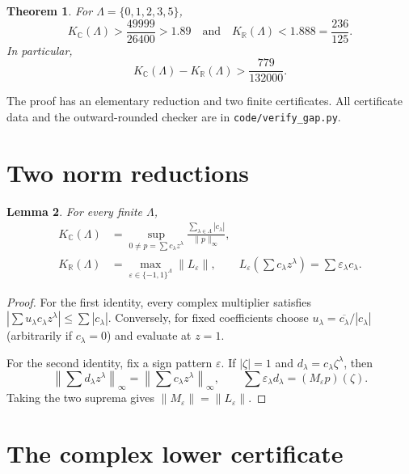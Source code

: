 \documentclass[11pt]{article}
\newtheorem{theorem}{Theorem}
\newtheorem{lemma}[theorem]{Lemma}
\theoremstyle{remark}
\newcommand{\KR}{K_{\mathbb R}}
\newcommand{\KC}{K_{\mathbb C}}
\begin{document}
\begin{theorem}\label{thm:gap}
For $\Lambda=\{0,1,2,3,5\}$,
\[
 \KC(\Lambda)>\frac{49999}{26400}>1.89
 \quad\text{and}\quad
 \KR(\Lambda)<1.888=\frac{236}{125}.
\]
In particular,
\[
 \KC(\Lambda)-\KR(\Lambda)>\frac{779}{132000}.
\]
\end{theorem}

The proof has an elementary reduction and two finite certificates.  All
certificate data and the outward-rounded checker are in
\texttt{code/verify\_gap.py}.

\section{Two norm reductions}

\begin{lemma}\label{lem:reductions}
For every finite $\Lambda$,
\begin{align*}
 \KC(\Lambda)
 &=\sup_{0\ne p=\sum c_\lambda z^\lambda}
   \frac{\sum_{\lambda\in\Lambda}|c_\lambda|}{\|p\|_\infty},\\
 \KR(\Lambda)
 &=\max_{\varepsilon\in\{-1,1\}^\Lambda}\|L_\varepsilon\|,
 \qquad
 L_\varepsilon\!\left(\sum c_\lambda z^\lambda\right)
 =\sum\varepsilon_\lambda c_\lambda.
\end{align*}
\end{lemma}

\begin{proof}
For the first identity, every complex multiplier satisfies
$|\sum u_\lambda c_\lambda z^\lambda|\leq\sum|c_\lambda|$.
Conversely, for fixed coefficients choose
$u_\lambda=\overline{c_\lambda}/|c_\lambda|$ (arbitrarily if
$c_\lambda=0$) and evaluate at $z=1$.

For the second identity, fix a sign pattern $\varepsilon$.  If $|\zeta|=1$
and $d_\lambda=c_\lambda\zeta^\lambda$, then
\[
 \left\|\sum d_\lambda z^\lambda\right\|_\infty
 =\left\|\sum c_\lambda z^\lambda\right\|_\infty,
 \qquad
 \sum\varepsilon_\lambda d_\lambda
 =(M_\varepsilon p)(\zeta).
\]
Taking the two suprema gives $\|M_\varepsilon\|=\|L_\varepsilon\|$.
\end{proof}

\section{The complex lower certificate}
\end{document}
